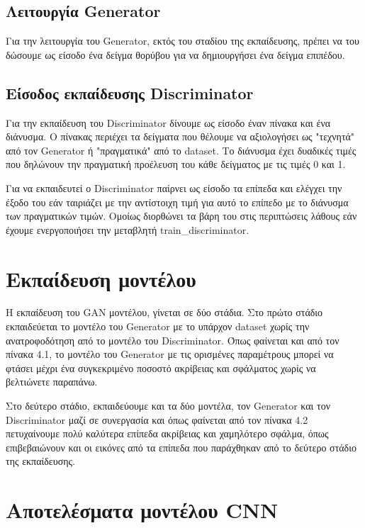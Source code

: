\subsection{Λειτουργία Generator}
Για την λειτουργία του Generator, εκτός του σταδίου της εκπαίδευσης, πρέπει να του δώσουμε ως είσοδο ένα δείγμα θορύβου για να δημιουργήσει ένα δείγμα επιπέδου.

\subsection{Είσοδος εκπαίδευσης Discriminator}
Για την εκπαίδευση του Discriminator δίνουμε ως είσοδο έναν πίνακα και ένα διάνυσμα. Ο πίνακας περιέχει τα δείγματα που θέλουμε να αξιολογήσει ως "τεχνητά" από τον Generator ή "πραγματικά" από το dataset. Το διάνυσμα έχει δυαδικές τιμές που δηλώνουν την πραγματική προέλευση του κάθε δείγματος με τις τιμές 0 και 1.
\par
Για να εκπαιδευτεί ο Discriminator παίρνει ως είσοδο τα επίπεδα και ελέγχει την έξοδο του εάν ταιριάζει με την αντίστοιχη τιμή για αυτό το επίπεδο με το διάνυσμα των πραγματικών τιμών. Ομοίως διορθώνει τα βάρη του στις περιπτώσεις λάθους εάν έχουμε ενεργοποιήσει την μεταβλητή train\_discriminator.

\section{Εκπαίδευση μοντέλου}
\par
Η εκπαίδευση του GAN μοντέλου, γίνεται σε δύο στάδια. Στο πρώτο στάδιο εκπαιδεύεται το μοντέλο του Generator με το υπάρχον dataset χωρίς την ανατροφοδότηση από το μοντέλο του Discriminator. Όπως φαίνεται και από τον πίνακα 4.1, το μοντέλο του Generator με τις ορισμένες παραμέτρους μπορεί να φτάσει μέχρι ένα συγκεκριμένο ποσοστό ακρίβειας και σφάλματος χωρίς να βελτιώνετε παραπάνω.
\par
Στο δεύτερο στάδιο, εκπαιδεύουμε και τα δύο μοντέλα, τον Generator και τον Discriminator μαζί σε συνεργασία και όπως φαίνεται από τον πίνακα 4.2 πετυχαίνουμε πολύ καλύτερα επίπεδα ακρίβειας και χαμηλότερο σφάλμα, όπως επιβεβαιώνουν και οι εικόνες από τα επίπεδα που παράχθηκαν από το δεύτερο στάδιο της εκπαίδευσης.


\section{Αποτελέσματα μοντέλου CNN}

